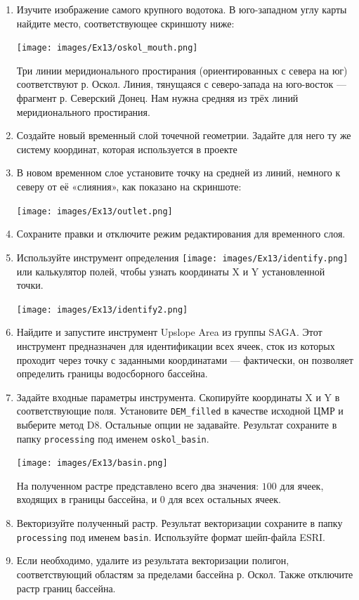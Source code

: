 \documentclass[
  12pt,
]{book}
\begin{document}
\begin{enumerate}
\def\labelenumi{\arabic{enumi}.}
\item
  Изучите изображение самого крупного водотока. В юго-западном углу карты найдите место, соответствующее скриншоту ниже:

  \texttt{[image: images/Ex13/oskol\_mouth.png]}

  Три линии меридионального простирания (ориентированных с севера на юг) соответствуют р. Оскол. Линия, тянущаяся с северо-запада на юго-восток --- фрагмент р. Северский Донец. Нам нужна средняя из трёх линий меридионального простирания.
\item
  Создайте новый временный слой точечной геометрии. Задайте для него ту же систему координат, которая используется в проекте
\item
  В новом временном слое установите точку на средней из линий, немного к северу от её «слияния», как показано на скриншоте:

  \texttt{[image: images/Ex13/outlet.png]}
\item
  Сохраните правки и отключите режим редактирования для временного слоя.
\item
  Используйте инструмент определения \texttt{[image: images/Ex13/identify.png]} или калькулятор полей, чтобы узнать координаты X и Y установленной точки.

  \texttt{[image: images/Ex13/identify2.png]}
\item
  Найдите и запустите инструмент Upslope Area из группы SAGA. Этот инструмент предназначен для идентификации всех ячеек, сток из которых проходит через точку с заданными координатами --- фактически, он позволяет определить границы водосборного бассейна.
\item
  Задайте входные параметры инструмента. Скопируйте координаты X и Y в соответствующие поля. Установите \texttt{DEM\_filled} в качестве исходной ЦМР и выберите метод D8. Остальные опции не задавайте. Результат сохраните в папку \texttt{processing} под именем \texttt{oskol\_basin}.

  \texttt{[image: images/Ex13/basin.png]}

  На полученном растре представлено всего два значения: \(100\) для ячеек, входящих в границы бассейна, и \(0\) для всех остальных ячеек.
\item
  Векторизуйте полученный растр. Результат векторизации сохраните в папку \texttt{processing} под именем \texttt{basin}. Используйте формат шейп-файла ESRI.
\item
  Если необходимо, удалите из результата векторизации полигон, соответствующий областям за пределами бассейна р. Оскол. Также отключите растр границ бассейна.


\end{enumerate}
\end{document}
